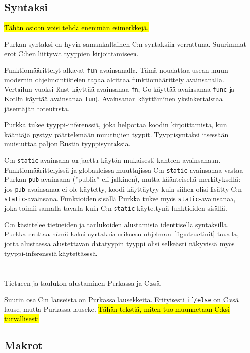 \subsection{Syntaksi}

\hl{Tähän osioon voisi tehdä enemmän esimerkkejä.}

Purkan syntaksi on hyvin samankaltainen C:n syntaksiin verrattuna. Suurimmat
erot C:hen liittyvät tyyppien kirjoittamiseen.

Funktiomäärittelyt alkavat \texttt{fun}-avainsanalla. Tämä noudattaa usean muun
modernin ohjelmointikielen tapaa aloittaa funktiomäärittely avainsanalla.
Vertailun vuoksi Rust käyttää avainsanaa \texttt{fn}, Go käyttää avainsanaa
\texttt{func} ja Kotlin käyttää avainsanaa \texttt{fun}). Avainsanan
käyttäminen yksinkertaistaa jäsentäjän toteutusta.

Purkka tukee tyyppi-inferenssiä, joka helpottaa koodin kirjoittamista, kun
kääntäjä pystyy päättelemään muuttujien tyypit. Tyyppisyntaksi itsessään
muistuttaa paljon Rustin tyyppisyntaksia.

C:n \texttt{static}-avainsana on jaettu käytön mukaisesti kahteen avainsanaan.
Funktiomäärittelyissä ja globaaleissa muuttujissa C:n
\texttt{static}-avainsanaa vastaa Purkan \texttt{pub}-avainsana (''public'' eli
julkinen), mutta käänteisellä merkityksellä: jos \texttt{pub}-avainsanaa ei ole
käytetty, koodi käyttäytyy kuin siihen olisi lisätty C:n
\texttt{static}-avainsana. Funktioiden sisällä Purkka tukee myös
\texttt{static}-avainsanaa, joka toimii samalla tavalla kuin C:n
\texttt{static} käytettynä funktioiden sisällä.

C:n käsittelee tietueiden ja taulukoiden alustamista identtisellä syntaksilla.
Purkka erottaa nämä kaksi syntaksia erikseen ohjelman~\ref{fig:structinit}
tavalla, jotta alustaessa alustettavan datatyypin tyyppi olisi selkeästi
näkyvissä myös tyyppi-inferenssiä käytettäessä.

\begin{listing}[ht!]
    \inputminted{Rust}{koodi/structinit.prk}
    \inputminted{C}{koodi/structinit.c}
    \caption{Tietueen ja taulukon alustaminen Purkassa ja C:ssä.}
    \label{fig:structinit}
\end{listing}

Suurin osa C:n lauseista on Purkassa lausekkeita. Erityisesti \texttt{if/else}
on C:ssä lause, mutta Purkassa lauseke. \hl{Tähän tekstiä, miten tuo muunnetaan
C:ksi turvallisesti}

\subsection{Makrot}

